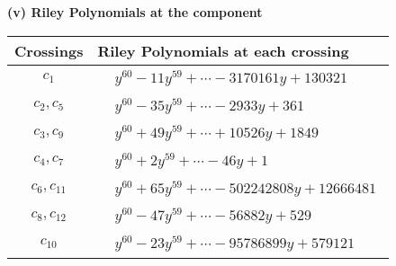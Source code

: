 \documentclass[1p]{elsarticle_modified}
\theoremstyle{definition}
\begin{document}
\flushleft \textbf{(v) Riley Polynomials at the component}\newline \\
\begin{tabular}{m{50pt}|m{274pt}}
Crossings & \hspace{64pt}Riley Polynomials at each crossing \\
\hline $$\begin{aligned}c_{1}\end{aligned}$$&$\begin{aligned}
&y^{60}-11 y^{59}+\cdots-3170161 y+130321
\end{aligned}$\\
\hline $$\begin{aligned}c_{2},c_{5}\end{aligned}$$&$\begin{aligned}
&y^{60}-35 y^{59}+\cdots-2933 y+361
\end{aligned}$\\
\hline $$\begin{aligned}c_{3},c_{9}\end{aligned}$$&$\begin{aligned}
&y^{60}+49 y^{59}+\cdots+10526 y+1849
\end{aligned}$\\
\hline $$\begin{aligned}c_{4},c_{7}\end{aligned}$$&$\begin{aligned}
&y^{60}+2 y^{59}+\cdots-46 y+1
\end{aligned}$\\
\hline $$\begin{aligned}c_{6},c_{11}\end{aligned}$$&$\begin{aligned}
&y^{60}+65 y^{59}+\cdots-502242808 y+12666481
\end{aligned}$\\
\hline $$\begin{aligned}c_{8},c_{12}\end{aligned}$$&$\begin{aligned}
&y^{60}-47 y^{59}+\cdots-56882 y+529
\end{aligned}$\\
\hline $$\begin{aligned}c_{10}\end{aligned}$$&$\begin{aligned}
&y^{60}-23 y^{59}+\cdots-95786899 y+579121
\end{aligned}$\\
\hline
\end{tabular}\\~\\
\end{document}
